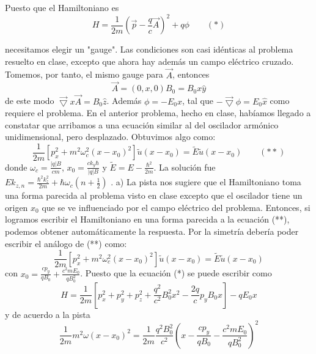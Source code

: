 \begin{solution}
Puesto que el Hamiltoniano es
\begin{equation*}
H=\frac{1}{2m}(\vec{p}-\frac{q}{c}\vec{A})^{2}+q\phi    \qquad (*)
\end{equation*}

necesitamos elegir un "gauge". Las condiciones son casi idénticas al problema resuelto en clase, excepto que ahora hay además un campo eléctrico cruzado.
Tomemos, por tanto, el mismo gauge para $\vec{A}$, entonces
\begin{equation*}
\vec{A}=(0, x, 0)B_0=B_0x\hat{y}
\end{equation*}
de este modo $\vec{\bigtriangledown}x\vec{A}=B_0\hat{z}$.
Además $\phi=-E_0x$, tal que  $-\vec{\bigtriangledown}\phi=E_0\hat{x}$ como requiere el problema.
En el anterior problema, hecho en clase, habíamos llegado a constatar que arribamos a una ecuación similar al del oscilador armónico unidimensional, pero desplazado. Obtuvimos algo como:
\begin{equation*}
\frac{1}{2m}[p_x^{2}+m^{2}\omega_c^{2}(x-x_0)^2]\tilde{u}(x-x_0)=\tilde{E}\tilde{u}(x-x_0) \qquad (**)
\end{equation*}
donde $\omega_c=\frac{ \left | q \right |B}{cm}$, $x_0=\frac{ck_y\hbar}{ \left | q \right |B}$ y $\tilde{E}=E-\frac{\hbar^{2}}{2m}$.
La solución fue $Ek_{z,n}=\frac{\hbar^{2}k_z^{2}}{2m}+\hbar\omega_c(n+\frac{1}{2})$ .
a) La pista nos sugiere que el Hamiltoniano toma una forma parecida al problema visto en clase excepto que el oscilador tiene un origen $x_0$ que se ve influenciado por el campo eléctrico del problema.
Entonces, si logramos escribir el Hamiltoniano en una forma parecida a la ecuación (**), podemos obtener automáticamente la respuesta. 
Por la simetría debería poder escribir el análogo de (**) como:
\begin{equation*}
\frac{1}{2m}[p_x^{2}+m^{2}\omega_c^{2}(x-x_0)^{2}]\tilde{u}(x-x_0)=\tilde{E}\tilde{u}(x-x_0)
\end{equation*}
con $x_0=\frac{cp_y}{qB_0}+\frac{c^{2}mE_0}{qB_0^{2}}$.
Puesto que la ecuación (*) se puede escribir como
\begin{equation*}
H=\frac{1}{2m}[p_x^{2}+p_y^{2}+p_z^{2}+\frac{q^{2}}{c^2}B_0^{2}x^{2}-\frac{2q}{c}p_yB_0x]-qE_0x
\end{equation*}
y de acuerdo a la pista
\begin{equation*}
\frac{1}{2m} m^2\omega(x-x_0)^2=\frac{1}{2m}\frac{q^2B_0^2}{c^2}(x-\frac{cp_y}{qB_0}-\frac{c^2mE_0}{qB_0^2})^2
\end{equation*}


\end{solution}
